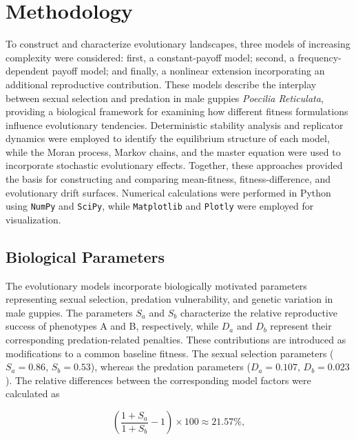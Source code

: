 
\section{Methodology}
\label{sec:methodology}

To construct and characterize evolutionary landscapes, three models of increasing complexity were considered: first, a constant-payoff model; second, a frequency-dependent payoff model; and finally, a nonlinear extension incorporating an additional reproductive contribution.
These models describe the interplay between sexual selection and predation in male guppies \textit{Poecilia Reticulata}, providing a biological framework for examining how different fitness formulations influence evolutionary tendencies. Deterministic stability analysis and replicator dynamics were employed to identify the equilibrium structure of each model, while the Moran process, Markov chains, and the master equation were used to incorporate stochastic evolutionary effects. Together, these approaches provided the basis for constructing and comparing mean-fitness, fitness-difference, and evolutionary drift surfaces. Numerical calculations were performed in Python using \texttt{NumPy} and \texttt{SciPy}, while \texttt{Matplotlib} and \texttt{Plotly} were employed for visualization. \\ 



\subsection{Biological Parameters}
\label{sec:biological_parameters}

The evolutionary models incorporate biologically motivated parameters representing sexual selection, predation vulnerability, and genetic variation in male guppies. The parameters $S_a$ and $S_b$ characterize the relative reproductive success of phenotypes A and B, respectively, while $D_a$ and $D_b$ represent their corresponding predation-related penalties. These contributions are introduced as modifications to a common baseline fitness. The sexual selection parameters ($S_a=0.86$, $S_b=0.53$), whereas the predation parameters ($D_a=0.107$, $D_b=0.023$). The relative differences between the corresponding model factors were calculated as

\begin{equation}
    \left(\frac{1+S_a}{1+S_b}-1\right)\times100
    \approx 21.57\%,
    \label{eq:relativeSucess}
\end{equation}


